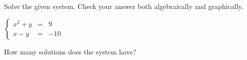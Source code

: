\documentclass{ximera}
\author{Kenneth Berglund}
\begin{document}
Solve the given system. Check your answer both algebraically and graphically.

$\left\{ \begin{array}{rcr} x^2+y & = & 9  \\ x-y  & = & -10  \end{array} \right.$

\begin{exercise}
How many solutions does the system have?
\begin{multipleChoice}  
\end{multipleChoice}  
\end{exercise}
\end{document}
